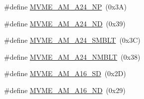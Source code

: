 \begin{DoxyCompactItemize}
\item 
\#define \hyperlink{group__mvmestdinclude_ga330662e4b7f7f421c8c12c9ec63128e3}{MVME\_\-AM\_\-A24\_\-NP}~(0x3A)
\item 
\#define \hyperlink{group__mvmestdinclude_ga803ae58eabffb7258a6b07843c6c2523}{MVME\_\-AM\_\-A24\_\-ND}~(0x39)
\item 
\#define \hyperlink{group__mvmestdinclude_ga06bd96ee4af5c67cde69e923e50d463f}{MVME\_\-AM\_\-A24\_\-SMBLT}~(0x3C)
\item 
\#define \hyperlink{group__mvmestdinclude_ga7b46ba6108b0d9b5248318ca29e9df95}{MVME\_\-AM\_\-A24\_\-NMBLT}~(0x38)
\item 
\#define \hyperlink{group__mvmestdinclude_gaf0a01859770bb4849814cd77f2812908}{MVME\_\-AM\_\-A16\_\-SD}~(0x2D)
\item 
\#define \hyperlink{group__mvmestdinclude_gaac7d8e02b3139be0c6943e1d2f0a8361}{MVME\_\-AM\_\-A16\_\-ND}~(0x29)
\end{DoxyCompactItemize}
